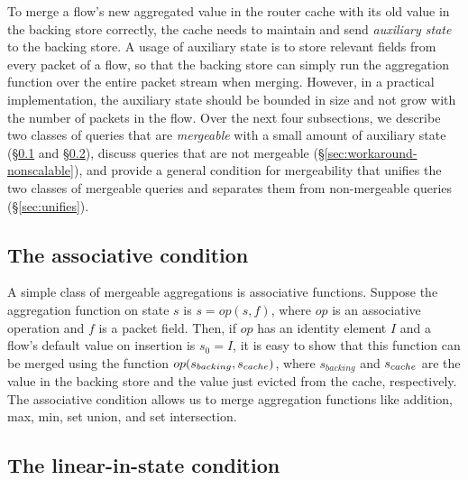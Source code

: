 To merge a flow's new aggregated value in the router cache with its old value in the backing store
correctly, the cache needs to maintain and send {\em auxiliary state} to the
backing store.  A \naive usage of auxiliary state is to store relevant fields
from every packet of a flow, so that the backing store can simply run the
aggregation function over the entire packet stream when merging.  However, in a
practical implementation, the auxiliary state should be bounded in size and not
grow with the number of packets in the flow. Over the next four subsections, we
describe two classes of queries that are {\em mergeable} with a small amount of
auxiliary state (\S\ref{sec:associative} and
\S\ref{sec:linear-in-state-description}), discuss queries that are not
mergeable (\S\ref{sec:workaround-nonscalable}), and provide a general condition
for mergeability that unifies the two classes of mergeable queries and 
separates them from non-mergeable queries (\S\ref{sec:unifies}).

\subsection{The associative condition}
\label{sec:associative}

A simple class of mergeable aggregations is associative functions.
Suppose the aggregation function on state $s$ is $s = op(s, f)$,
where $op$ is an associative operation and $f$ is a packet field. Then, if $op$
has an identity element $I$ and a flow's default value on insertion is $s_0 =
I$, it is easy to show that this function can be merged using the function
$op(s_{backing}, s_{cache})$, where $s_{backing}$ and $s_{cache}$ are the value in
the backing store and the value just evicted from the cache, respectively. The
associative condition allows us to merge aggregation functions like addition,
max, min, set union, and set intersection.

\subsection{The linear-in-state condition}
\label{sec:linear-in-state-description}

